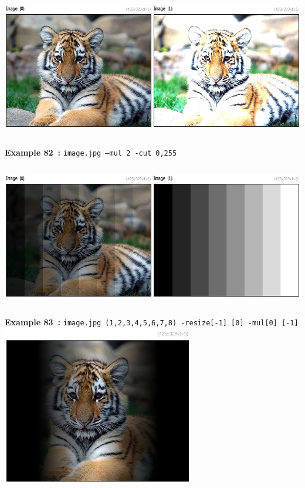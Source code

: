 \documentclass[a4paper,11pt,twoside]{book}
\begin{document}
\begin{center}\includegraphics[keepaspectratio=true,height=7cm,width=\textwidth]{img/gmic_def82.jpg}\\
{\footnotesize \textbf{Example 82~:} \texttt{image.jpg --mul 2 -cut 0,255}}
\\\includegraphics[keepaspectratio=true,height=7cm,width=\textwidth]{img/gmic_def83.jpg}\\
{\footnotesize \textbf{Example 83~:} \texttt{image.jpg (1,2,3,4,5,6,7,8) -resize[-1] [0] -mul[0] [-1]}}
\\\includegraphics[keepaspectratio=true,height=7cm,width=\textwidth]{img/gmic_def84.jpg}\\

\end{center}
\end{document}
